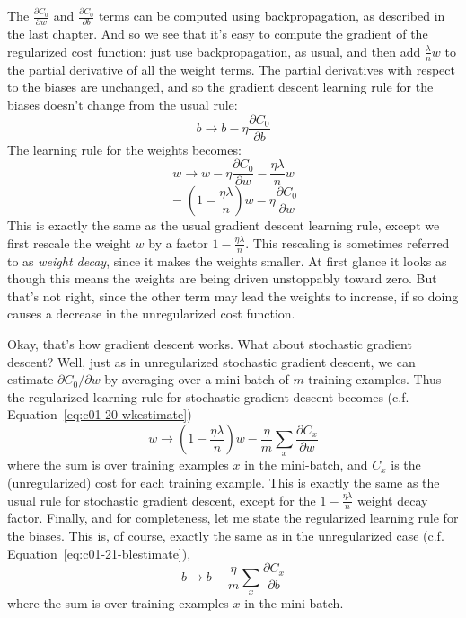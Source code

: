 The $\frac{\partial C_{0}}{\partial w}$ and $\frac{\partial C_{0}}{\partial b} $ terms can be computed using backpropagation, as described in the last chapter. And so we see that it's easy to compute the gradient of the regularized cost function: just use backpropagation, as usual, and then add $\frac{\lambda}{n} w$ to the partial derivative of all the weight terms. The partial derivatives with respect to the biases are unchanged, and so the gradient descent learning rule for the biases doesn't change from the usual rule:
\begin{equation}
b \rightarrow b-\eta \frac{\partial C_{0}}{\partial b}
\label{eq:c03-90} 
\end{equation}
The learning rule for the weights becomes:
\begin{equation}
w \rightarrow w-\eta \frac{\partial C_{0}}{\partial w}-\frac{\eta \lambda}{n} w
\label{eq:c03-91} 
\end{equation}
\begin{equation}
=\left(1-\frac{\eta \lambda}{n}\right) w-\eta \frac{\partial C_{0}}{\partial w}
\label{eq:c03-92} 
\end{equation}
This is exactly the same as the usual gradient descent learning rule, except we first rescale the weight $w$ by a factor $1-\frac{\eta \lambda}{n}$. This rescaling is sometimes referred to as \textit{weight decay}, since it makes the weights smaller. At first glance it looks as though this means the weights are being driven unstoppably toward zero. But that's not right, since the other term may lead the weights to increase, if so doing causes a decrease in the unregularized cost function.

Okay, that's how gradient descent works. What about stochastic gradient descent? Well, just as in unregularized stochastic gradient descent, we can estimate $\partial C_{0} / \partial w$ by averaging over a mini-batch of $m$ training examples. Thus the regularized learning rule for stochastic gradient descent becomes (c.f. Equation~\ref{eq:c01-20-wkestimate})
\begin{equation}
w \rightarrow\left(1-\frac{\eta \lambda}{n}\right) w-\frac{\eta}{m} \sum_{x} \frac{\partial C_{x}}{\partial w}
\label{eq:c03-93} 
\end{equation}
where the sum is over training examples $x$ in the mini-batch, and $C_x$ is the (unregularized) cost for each training example. This is exactly the same as the usual rule for stochastic gradient descent, except for the $1-\frac{\eta \lambda}{n}$ weight decay factor. Finally, and for completeness, let me state the regularized learning rule for the biases. This is, of course, exactly the same as in the unregularized case (c.f. Equation~\ref{eq:c01-21-blestimate}),
\begin{equation}
b \rightarrow b-\frac{\eta}{m} \sum_{x} \frac{\partial C_{x}}{\partial b}
\label{eq:c03-94} 
\end{equation}
where the sum is over training examples $x$ in the mini-batch.

